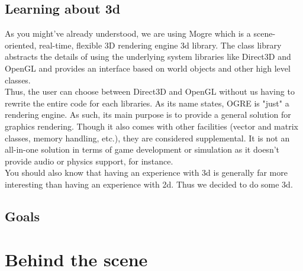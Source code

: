 \documentclass[article]{report} %
\begin{document}
						\section{Learning about 3d}
								As you might've already understood, we are using Mogre which is a scene-oriented, real-time, flexible 3D rendering engine 3d library.\newline
								The class library abstracts the details of using the underlying system libraries like Direct3D and OpenGL and provides an interface based on world objects and other high level classes.\\
								
								Thus, the user can choose between Direct3D and OpenGL without us having to rewrite the entire code for each libraries. As its name states, OGRE is "just" a rendering engine. As such, its main purpose is to provide a general solution for graphics rendering. Though it also comes with other facilities (vector and matrix classes, memory handling, etc.), they are considered supplemental. It is not an all-in-one solution in terms of game development or simulation as it doesn't provide audio or physics support, for instance.\\
								
								You should also know that having an experience with 3d is generally far more interesting than having an experience with 2d. Thus we decided to do some 3d.
								
								
					
						\section{Goals}
				\chapter{Behind the scene}
				
\end{document}
